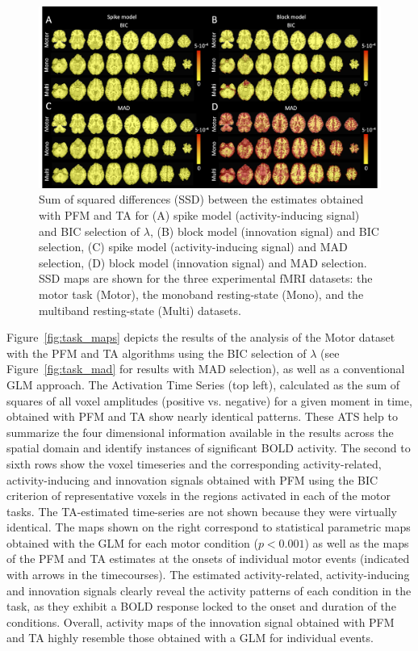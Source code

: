 \begin{figure}[t!]
    \begin{center}
        \includegraphics[width=\textwidth]{figures/comp_figure.png}
    \end{center}
    \caption{Sum of squared differences (SSD) between the estimates obtained with PFM and TA for (A) spike model (activity-inducing signal) and BIC selection of $\lambda$, (B) block model (innovation signal) and BIC selection, (C) spike model (activity-inducing signal) and MAD selection, (D) block model (innovation signal) and MAD selection. SSD maps are shown for the three experimental fMRI datasets: the motor task (Motor), the monoband resting-state (Mono), and the multiband resting-state (Multi) datasets.}
\label{fig:rss}
\end{figure}

Figure~\ref{fig:task_maps} depicts the results of the analysis of the Motor dataset with the PFM and TA algorithms using the BIC selection of $\lambda$ (see Figure~\ref{fig:task_mad} for results with MAD selection), as well as a conventional GLM approach. The Activation Time Series (top left), calculated as the sum of squares of all voxel amplitudes (positive vs. negative) for a given moment in time, obtained with PFM and TA show nearly identical patterns. These ATS help to summarize the four dimensional information available in the results across the spatial domain and identify instances of significant BOLD activity. The second to sixth rows show the voxel timeseries and the corresponding activity-related, activity-inducing and innovation signals obtained with PFM using the BIC criterion of representative voxels in the regions activated in each of the motor tasks. The TA-estimated time-series are not shown because they were virtually identical. The maps shown on the right correspond to statistical parametric maps obtained with the GLM for each motor condition ($p < 0.001$) as well as the maps of the PFM and TA estimates at the onsets of individual motor events (indicated with arrows in the timecourses). The estimated activity-related, activity-inducing and innovation signals clearly reveal the activity patterns of each condition in the task, as they exhibit a BOLD response locked to the onset and duration of the conditions. Overall, activity maps of the innovation signal obtained with PFM and TA highly resemble those obtained with a GLM for individual events.

